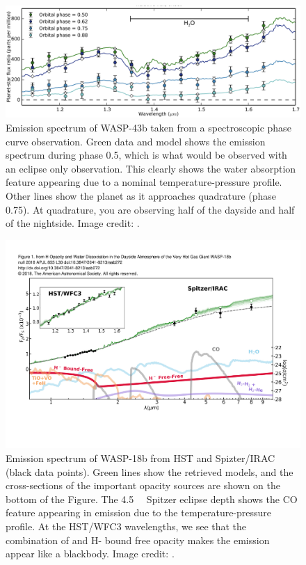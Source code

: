 \begin{figure}
    \centering
    \includegraphics[width = \linewidth]{Wasp-43b_water.png}
    \caption{Emission spectrum of WASP-43b taken from a spectroscopic phase curve observation. Green data and model shows the emission spectrum during phase 0.5, which is what would be observed with an eclipse only observation. This clearly shows the water absorption feature appearing due to a nominal temperature-pressure profile. Other lines show the planet as it approaches quadrature (phase 0.75). At quadrature, you are observing half of the dayside and half of the nightside. Image credit: \citet{Stevenson2014c}.}
    \label{int:fig:w43}
\end{figure}

\begin{figure}
    \centering
    \includegraphics[width = \linewidth]{arcangeli+18.pdf}
    \caption{Emission spectrum of WASP-18b from HST and Spizter/IRAC (black data points). Green lines show the retrieved models, and the cross-sections of the important opacity sources are shown on the bottom of the Figure. The 4.5~\um~ Spitzer eclipse depth shows the CO feature appearing in emission due to the temperature-pressure profile. At the HST/WFC3 wavelengths, we see that the combination of  and H- bound free opacity makes the emission appear like a blackbody. Image credit: \citet{Arcangeli2018}. }
    \label{int:fig:w18}
\end{figure}

